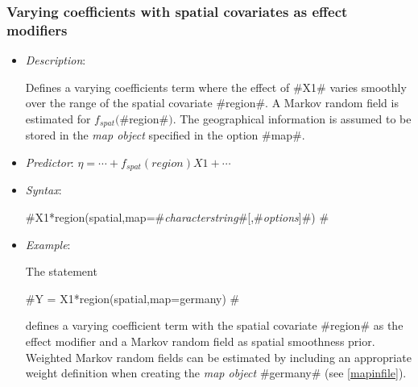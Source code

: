 \subsubsection*{Varying coefficients with spatial covariates as
effect modifiers}

\begin{itemize}
\item[] {\em Description}:

Defines a varying coefficients term where the effect of #X1#
varies smoothly over the range of the spatial covariate #region#.
A Markov random field is estimated for $f_{spat}($#region#$)$. The
geographical information is assumed to be stored in the {\em map
object} specified in the option #map#.

\item[] {\em Predictor}: $\eta = \cdots + f_{spat}(region)X1 +
\cdots$

\item[] {\em Syntax}:

#X1*region(spatial,map=#{\em characterstring}#[,#{\em options}]#) #
\item[] {\em Example}:

The statement

#Y = X1*region(spatial,map=germany) #

defines a varying coefficient term with the spatial covariate
#region# as the effect modifier and a Markov random field as spatial
smoothness prior. Weighted Markov random fields can be estimated by
including an appropriate weight definition when creating the {\em
map object} #germany# (see \autoref{mapinfile}).
\end{itemize}




